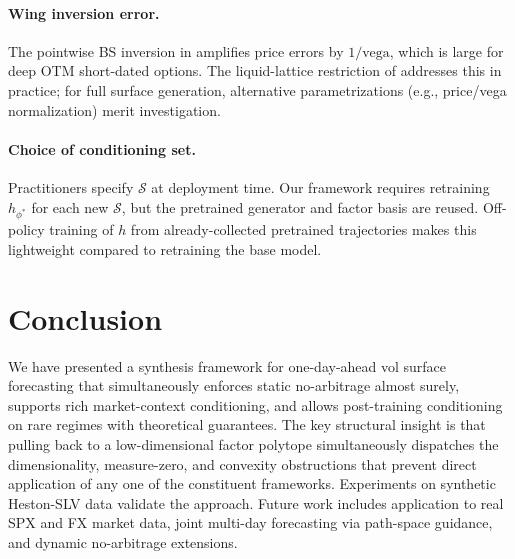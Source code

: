 \documentclass{article}
\newcommand{\1}{\mathbf{1}}
\newcommand{\cS}{\mathcal{S}}
\begin{document}
\paragraph{Wing inversion error.} The pointwise BS inversion in  amplifies price errors by $1/\text{vega}$, which is large for deep OTM short-dated options. The liquid-lattice restriction of \citet{cohen2021} addresses this in practice; for full surface generation, alternative parametrizations (e.g., price/vega normalization) merit investigation.

\paragraph{Choice of conditioning set.} Practitioners specify $\cS$ at deployment time. Our framework requires retraining $h_{\phi^*}$ for each new $\cS$, but the pretrained generator and factor basis are reused. Off-policy training of $h$ from already-collected pretrained trajectories makes this lightweight compared to retraining the base model.

\section{Conclusion}

We have presented a synthesis framework for one-day-ahead vol surface forecasting that simultaneously enforces static no-arbitrage almost surely, supports rich market-context conditioning, and allows post-training conditioning on rare regimes with theoretical guarantees. The key structural insight is that pulling back to a low-dimensional factor polytope simultaneously dispatches the dimensionality, measure-zero, and convexity obstructions that prevent direct application of any one of the constituent frameworks. Experiments on synthetic Heston-SLV data validate the approach. Future work includes application to real SPX and FX market data, joint multi-day forecasting via path-space guidance, and dynamic no-arbitrage extensions.
\end{document}
